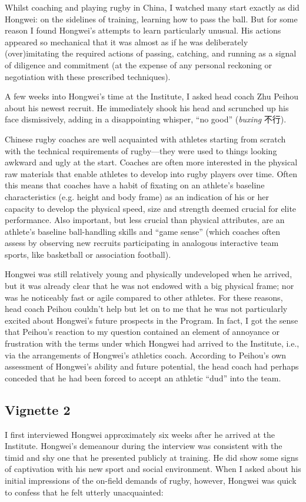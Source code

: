 Whilst coaching and playing rugby in China, I watched many start exactly as did Hongwei: on the sidelines of training, learning how to pass the ball. But for some reason I found Hongwei’s attempts to learn particularly unusual.  His actions appeared so mechanical that it was almost as if he was deliberately (over)imitating the required actions of passing, catching, and running as a signal of diligence and commitment (at the expense of any personal reckoning or negotiation with these prescribed techniques).


A few weeks into Hongwei’s time at the Institute, I asked head coach Zhu Peihou about his newest recruit.  He immediately shook his head and scrunched up his face dismissively, adding in a disappointing whisper, ``no good'' (\textit{buxing} 不行).

Chinese rugby coaches are well acquainted with athletes starting from scratch with the technical requirements of rugby---they were used to things looking awkward and ugly at the start. Coaches are often more interested in the physical raw materials that enable athletes to develop into rugby players over time.  Often this means that coaches have a habit of fixating on an athlete's baseline characteristics (e.g. height and body frame) as an indication of his or her capacity to develop the physical speed, size and strength deemed crucial for elite performance.  Also important, but less crucial than physical attributes, are an athlete’s baseline ball-handling skills and ``game sense'' (which coaches often assess by observing new recruits participating in analogous interactive team sports, like basketball or association football).

Hongwei was still relatively young and physically undeveloped when he arrived, but it was already clear that he was not endowed with a big physical frame; nor was he noticeably fast or agile compared to other athletes.  For these reasons, head coach Peihou couldn’t help but let on to me that he was not particularly excited about Hongwei's future prospects in the Program.  In fact, I got the sense that Peihou's reaction to my question contained an element of annoyance or frustration with the terms under which Hongwei had arrived to the Institute, i.e., via the arrangements of Hongwei’s athletics coach.  According to Peihou's own assessment of Hongwei's ability and future potential, the head coach had perhaps conceded that he had been forced to accept an athletic ``dud'' into the team.

\subsection{Vignette 2}
I first interviewed Hongwei approximately six weeks after he arrived at the Institute.   Hongwei's demeanour during the interview was consistent with the timid and shy one that he presented publicly at training. He did show some signs of captivation with his new sport and social environment.  When I asked about his initial impressions of the on-field demands of rugby, however, Hongwei was quick to confess that he felt utterly unacquainted:

